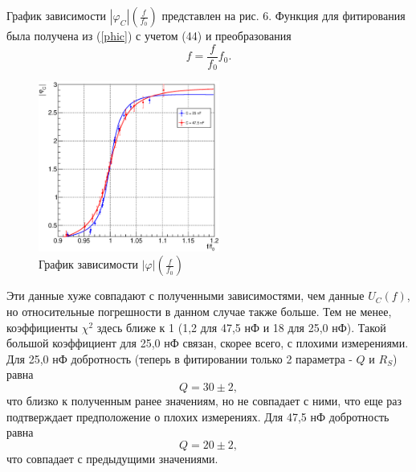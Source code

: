 \documentclass[12pt,a4paper]{article}
\begin{document}
График зависимости $|\varphi_C|\left(\frac{f}{f_0}\right)$ представлен на рис. 6. Функция для фитирования была получена из (\ref{phic}) с учетом (44) и преобразования
\begin{equation}
f = \frac{f}{f_0}f_0.
\end{equation}
\begin{figure}
\centering\includegraphics[width = 0.53\textwidth]{Plt3}
\captionsetup{justification = centering}
\caption{График зависимости $|\varphi|\left(\frac{f}{f_0}\right)$\label{Fig6}}
\end{figure}
Эти данные хуже совпадают с полученными зависимостями, чем данные $U_C(f)$, но относительные погрешности в данном случае также больше. Тем не менее, коэффициенты $\chi^2$ здесь ближе к 1 (1,2 для 47,5 нФ и 18 для 25,0 нФ). Такой большой коэффициент для 25,0 нФ связан, скорее всего, с плохими измерениями. Для 25,0 нФ добротность (теперь в фитировании только 2 параметра - $Q$ и $R_S$) равна
\begin{equation}
Q = 30\pm2,
\end{equation}
что близко к полученным ранее значениям, но не совпадает с ними, что еще раз подтверждает предположение о плохих измерениях. Для 47,5 нФ добротность равна
\begin{equation}
Q = 20\pm2,
\end{equation}
что совпадает с предыдущими значениями.
\end{document}
